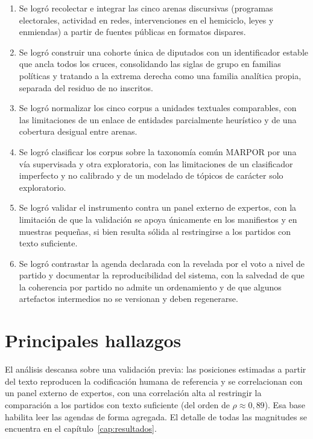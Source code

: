 \begin{enumerate}
  \item Se logró recolectar e integrar las cinco arenas discursivas (programas
  electorales, actividad en redes, intervenciones en el hemiciclo, leyes y
  enmiendas) a partir de fuentes públicas en formatos dispares.
  \item Se logró construir una cohorte única de diputados con un identificador
  estable que ancla todos los cruces, consolidando las siglas de grupo en
  familias políticas y tratando a la extrema derecha como una familia analítica
  propia, separada del residuo de no inscritos.
  \item Se logró normalizar los cinco corpus a unidades textuales comparables,
  con las limitaciones de un enlace de entidades parcialmente heurístico y de una
  cobertura desigual entre arenas.
  \item Se logró clasificar los corpus sobre la taxonomía común MARPOR por una
  vía supervisada y otra exploratoria, con las limitaciones de un clasificador
  imperfecto y no calibrado y de un modelado de tópicos de carácter solo
  exploratorio.
  \item Se logró validar el instrumento contra un panel externo de expertos, con
  la limitación de que la validación se apoya únicamente en los manifiestos y en
  muestras pequeñas, si bien resulta sólida al restringirse a los partidos con
  texto suficiente.
  \item Se logró contrastar la agenda declarada con la revelada por el voto a
  nivel de partido y documentar la reproducibilidad del sistema, con la salvedad
  de que la coherencia por partido no admite un ordenamiento y de que algunos
  artefactos intermedios no se versionan y deben regenerarse.
\end{enumerate}

\section{Principales hallazgos}
\label{sec:concl-hallazgos}

El análisis descansa sobre una validación previa: las posiciones estimadas a
partir del texto reproducen la codificación humana de referencia y se
correlacionan con un panel externo de expertos, con una correlación alta al
restringir la comparación a los partidos con texto suficiente (del orden de
$\rho \approx 0{,}89$). Esa base habilita leer las agendas de forma agregada. El
detalle de todas las magnitudes se encuentra en el
capítulo~\ref{cap:resultados}.

